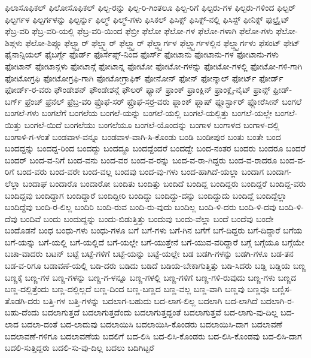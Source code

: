 {ಫಿಲಾಸೊಫಿಕಲ್
ಫಿಲೋಸೊಫಿಕಲ್
ಫಿಲ್ಟ-ರನ್ನು
ಫಿಲ್ಟ-ರಿ-ಗಿಂತಲೂ
ಫಿಲ್ಟ-ರಿಗೆ
ಫಿಲ್ಟರು-ಗಳ
ಫಿಲ್ಟರು-ಗಳಿಂದ
ಫಿಲ್ಟರ್
ಫಿಲ್ಟರ್ಗಳ
ಫಿಲ್ಟರ್ಗಳನ್ನು
ಫಿಲ್ಟರ್ನ್ನು
ಫಿಲ್ಮ್
ಫಿಲ್ಮ್-ಗಳು
ಫಿಸಿಕಲ್
ಫಿಸಿಕ್ಸ್
ಫಿಸಿಕ್ಸ್-ನಲ್ಲಿ
ಫಿಸಿಸ್ಟ್
ಫೀನಿಕ್ಸ್
ಫುಲ್ಬ್ರೈಟ್
ಫೆಬ್ರ-ವರಿ
ಫೆಬ್ರ-ವರಿ-ಯಲ್ಲಿ
ಫೆಬ್ರ-ವರಿ-ಯಿಂದ
ಫೆಬ್ರೀ
ಫೆಲೋ
ಫೆಲೋ-ಗಳ
ಫೆಲೋ-ಗಳಾಗಿ
ಫೆಲೋ-ಗಳು
ಫೆಲೋ-ಶಿಪ್ಗಳು
ಫೆಲೋ-ಶಿಪ್ಗೂ
ಫೆಲ್ಟ್ಸ್ಟಾರ್
ಫೆಲ್ಡ್ಸ್ಪಾರ್
ಫೆಲ್ಡ್ಸ್ಟಾರ್
ಫೆಲ್ಡ್ಸ್ಟಾರ್ಗಳ
ಫೆಲ್ಡ್ಸ್ಟಾರ್ಗಳಲ್ಲಿನ
ಫೆಲ್ಡ್ಸ್ಟಾರ್ಗಳು
ಫೆಸಂಟ್
ಫೇಟ್
ಫೈನಾನ್ಸಿಯಲ್
ಫೈಬರ್ಗ್ಗೆ
ಫೊರ್ಡ್
ಫೊರ್ಸೆಪ್ಸ್-ನಿಂದ
ಫೊರ್ಸ್
ಫೋಟಾನು
ಫೋಟಾನು-ಗಳ
ಫೋಟಾನು-ಗಳು
ಫೋಟಾನ್
ಫೋಟಾನ್ಗಳು
ಫೋಟಾನ್ಗೆ
ಫೋಟಾನ್ನ
ಫೋಟೋ
ಫೋಟೋ-ಗಳನ್ನು
ಫೋಟೋ-ಗಳಲ್ಲಿ
ಫೋಟೋ-ಗಳಿ-ಗಾಗಿ
ಫೋಟೋಗ್ರಫಿ
ಫೋಟೋಗ್ರಫಿ-ಗಾಗಿ
ಫೋಟೋಗ್ರಾಫಿಕ್
ಫೋನೋನ್
ಫೋನ್
ಫೋನ್ಕಾಲ್
ಫೋರ್ಟ್
ಫೋರ್ಡ್
ಫೋರ್ಡ್-ರ-ವರು
ಫೌಂಡೇಶನ್
ಫೌಂಡೇಶನ್ಗೆ
ಫೌಲರ್
ಫ್ಯಾನ್
ಫ್ರಾಂಕ್
ಫ್ರಾಂಕ್ಲಿನ್
ಫ್ರಾಂಕ್ಲೈ-ನೈಟ್
ಫ್ರಾನ್ಸ್
ಫ್ರೀಡ್-ಬರ್ಗ್
ಫ್ರೆಂಚ್
ಫ್ರೆನೆಲ್
ಫ್ರೆಬ್ರ-ವರಿ
ಫ್ರೊಫೆ-ಸರ್
ಫ್ರೊಫೆ-ಸರ್ರ-ವರು
ಫ್ಲಾಂಕ್
ಫ್ಲಾಷ್
ಫ್ಲೂರ್ಸ್ಟಾರ್
ಫ್ಲೋರೆಸೀನ್
ಬಂಗಲೆ
ಬಂಗಲೆ-ಗಳು
ಬಂಗಲೆಗೆ
ಬಂಗಲೆಯ
ಬಂಗಲೆ-ಯನ್ನು
ಬಂಗಲೆ-ಯಲ್ಲಿ
ಬಂಗಲೆ-ಯಲ್ಲಿತ್ತು
ಬಂಗಲೆ-ಯಲ್ಲೇ
ಬಂಗಲೆ-ಯಿತ್ತು
ಬಂಗಲೆ-ಯಿದೆ
ಬಂಗಲೆಯು
ಬಂಗಲೆಯೂ
ಬಂಗಲೆ-ಯೊಂದನ್ನು
ಬಂಗಾಳ
ಬಂಗಾಳದ
ಬಂಗಾಳ-ದಲ್ಲಿ
ಬಂಗಾಳಿ-ಗ-ಳಂತೆ
ಬಂಡವಾಳ-ವನ್ನೂ
ಬಂಡವಾಳ-ವಾಗಿ-ಸಿ-ಕೊಂಡು
ಬಂಡಿ
ಬಂಡೀಪುರ
ಬಂತು
ಬಂತೇ
ಬಂದ
ಬಂದದ್ದನ್ನು
ಬಂದದ್ದ-ರಿಂದ
ಬಂದದ್ದು
ಬಂದದ್ದೂ
ಬಂದದ್ದೆಂದರೆ
ಬಂದದ್ದೇ
ಬಂದ-ನಂತರ
ಬಂದರು
ಬಂದರೂ
ಬಂದರೆ
ಬಂದರ್
ಬಂದ-ವ-ನಿಗೆ
ಬಂದ-ವನು
ಬಂದ-ವರ
ಬಂದ-ವ-ರನ್ನು
ಬಂದ-ವ-ರಾ-ಗಿದ್ದರು
ಬಂದ-ವ-ರಾದರೂ
ಬಂದ-ವ-ರಿಗೆ
ಬಂದ-ವರು
ಬಂದ-ವರೇ
ಬಂದ-ವಲ್ಲ
ಬಂದವು
ಬಂದ-ವು-ಗಳು
ಬಂದ-ಹಾಗಿದೆ-ಯಲ್ಲಾ
ಬಂದಾಗ
ಬಂದಾಗ-ಲೆಲ್ಲಾ
ಬಂದಾಘ
ಬಂದಾರೊ
ಬಂದಾರೋ
ಬಂದಿತು
ಬಂದಿತ್ತು
ಬಂದಿದೆ
ಬಂದಿದ್ದ
ಬಂದಿದ್ದರು
ಬಂದಿದ್ದರೆ
ಬಂದಿದ್ದ-ವರು
ಬಂದಿದ್ದವು
ಬಂದಿದ್ದಾಗ
ಬಂದಿದ್ದಾರೆ
ಬಂದಿದ್ದೀರಿ
ಬಂದಿದ್ದು
ಬಂದಿದ್ದು-ದನ್ನು
ಬಂದಿದ್ದುದು
ಬಂದಿದ್ದೆ
ಬಂದಿದ್ದೆಲ್ಲಾ
ಬಂದಿದ್ದೆವು
ಬಂದಿ-ರ-ಲಿಲ್ಲ
ಬಂದಿರಿ
ಬಂದಿ-ರುವ
ಬಂದಿ-ರು-ವುದು
ಬಂದಿಲ್ಲ
ಬಂದಿ-ಳಿ-ದರು
ಬಂದಿ-ಳಿ-ದವು
ಬಂದಿ-ಳಿ-ದೆವು
ಬಂದಿವೆ
ಬಂದು
ಬಂದುದ್ದನ್ನು
ಬಂದು-ಬಿಡುತ್ತಿತ್ತು
ಬಂದುವು
ಬಂದು-ವೆಲ್ಲಾ
ಬಂದೆ
ಬಂದೆವು
ಬಂದೇ
ಬಂದೊಡನೆ
ಬಂಧ
ಬಂಧು-ಗಳು
ಬಂಧು-ಗಳೂ
ಬಗೆ
ಬಗೆ-ಗಳು
ಬಗೆ-ಗಿನ
ಬಗೆಗೆ
ಬಗೆ-ದಿದ್ದರು
ಬಗೆ-ದಿದ್ದಾರೆ
ಬಗೆಯ
ಬಗೆ-ಯನ್ನು
ಬಗೆ-ಯಲ್ಲಿ
ಬಗೆ-ಯಲ್ಲಿದೆ
ಬಗೆ-ಯಲ್ಲೇ
ಬಗೆ-ಯುತ್ತೇನೆ
ಬಗೆ-ಯುವ-ವರಿದ್ದಾರೆ
ಬಗ್ಗೆ
ಬಗ್ಗೆಯೂ
ಬಗ್ಗೆಯೇ
ಬಚಾ-ವಾದರು
ಬಟನ್
ಬಟ್ಟೆ
ಬಟ್ಟೆ-ಗಳಿಗೆ
ಬಟ್ಟೆ-ಯನ್ನು
ಬಟ್ಟೆ-ಯಲ್ಲೇ
ಬಡ
ಬಡಗಿ-ಗಳನ್ನು
ಬಡಗಿ-ಗಳೂ
ಬಡ-ತನ
ಬಡ-ವ-ರಿಗೂ
ಬಡಾವಣೆ-ಯಲ್ಲಿ
ಬಡಿ-ದರು
ಬಡಿದು
ಬಡಿದೆ
ಬಡಿಯ-ಬೇಕಾಗುತ್ತಿತ್ತು
ಬಡಿ-ಸಿದರು
ಬಡ್ಡಿ
ಬಡ್ಡಿಯ
ಬಣ್ಣ
ಬಣ್ಣಕ್ಕೆ
ಬಣ್ಣ-ಗಳ
ಬಣ್ಣ-ಗಳನ್ನು
ಬಣ್ಣ-ಗ-ಳನ್ನೂ
ಬಣ್ಣ-ಗಳಲ್ಲಿ
ಬಣ್ಣ-ಗಳಿಗೆ
ಬಣ್ಣ-ಗಳಿ-ರುವುದು
ಬಣ್ಣ-ಗಳು
ಬಣ್ಣದ
ಬಣ್ಣ-ದಲ್ಲಿತ್ತೆಂದು
ಬಣ್ಣ-ದಲ್ಲಿಲ್ಲದೆ
ಬಣ್ಣ-ದಿಂದ
ಬಣ್ಣ-ಬಣ್ಣದ
ಬಣ್ಣ-ವಲ್ಲ
ಬಣ್ಣ-ವಾಗಿ
ಬಣ್ಣವು
ಬಣ್ಣವೂ
ಬಣ್ಣಿಸ-ತೊಡಗಿ-ದರು
ಬತ್ತಿ-ಗಳ
ಬತ್ತಿ-ಗಳನ್ನು
ಬದಲಾಗ-ಬಹುದು
ಬದ-ಲಾಗ-ಲಿಲ್ಲ
ಬದಲಾಗಿ
ಬದ-ಲಾಗಿದೆ
ಬದಲಾಗಿ-ರ-ಬಹು-ದೆಂದು
ಬದಲಾಗುತ್ತದೆ
ಬದಲಾಗುತ್ತದೆಂದು
ಬದಲಾಗುತ್ತದ್ದಂತೆ
ಬದಲಾಗುತ್ತವೆ
ಬದ-ಲಾಗು-ವು-ದಿಲ್ಲ
ಬದ-ಲಾದ
ಬದಲಾ-ದಂತೆ
ಬದ-ಲಾದುವು
ಬದಲಾಯಿಸಿ
ಬದಲಾಯಿಸಿ-ಕೊಂಡರು
ಬದಲಾಯಿಸಿ-ದಾಗ
ಬದಲಾವಣೆ
ಬದಲಾವಣೆ-ಗಳಿಗೂ
ಬದಲಾವಣೆಯ
ಬದಲಿಗೆ
ಬದ-ಲಿಸಿ
ಬದ-ಲಿಸಿ-ಕೊಂಡರು
ಬದ-ಲಿಸಿ-ಕೊಂಡವು
ಬದ-ಲಿಸಿ-ದಾಗ
ಬದಲಿ-ಸುತ್ತಿದ್ದರು
ಬದಲಿ-ಸು-ವು-ದಿಲ್ಲ
ಬದಲು
ಬದಿಗಿಟ್ಟರೆ
}
